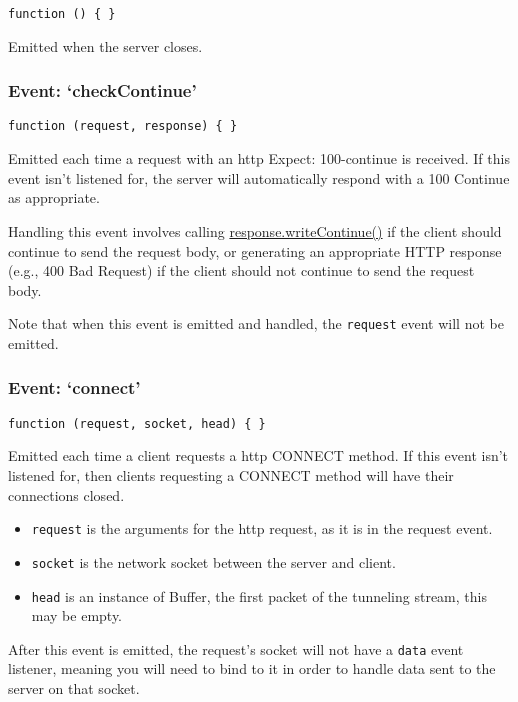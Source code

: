 \texttt{function\ ()\ \{\ \}}

Emitted when the server closes.

\subsubsection{\texorpdfstring{Event:
`checkContinue'}{Event: checkContinue}}\label{event-checkcontinue}

\texttt{function\ (request,\ response)\ \{\ \}}

Emitted each time a request with an http Expect: 100-continue is
received. If this event isn't listened for, the server will
automatically respond with a 100 Continue as appropriate.

Handling this event involves calling
\hyperref[httpux5fresponseux5fwritecontinue]{response.writeContinue()}
if the client should continue to send the request body, or generating an
appropriate HTTP response (e.g., 400 Bad Request) if the client should
not continue to send the request body.

Note that when this event is emitted and handled, the \texttt{request}
event will not be emitted.

\subsubsection{\texorpdfstring{Event:
`connect'}{Event: connect}}\label{event-connect}

\texttt{function\ (request,\ socket,\ head)\ \{\ \}}

Emitted each time a client requests a http CONNECT method. If this event
isn't listened for, then clients requesting a CONNECT method will have
their connections closed.

\begin{itemize}
\itemsep1pt\parskip0pt
\item
  \texttt{request} is the arguments for the http request, as it is in
  the request event.
\item
  \texttt{socket} is the network socket between the server and client.
\item
  \texttt{head} is an instance of Buffer, the first packet of the
  tunneling stream, this may be empty.
\end{itemize}

After this event is emitted, the request's socket will not have a
\texttt{data} event listener, meaning you will need to bind to it in
order to handle data sent to the server on that socket.


